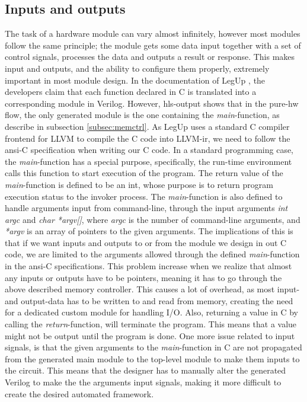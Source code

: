 \subsection{\label{subsec:inoutprobs}Inputs and outputs}
The task of a hardware module can vary almost infinitely, however most modules follow the same principle; the module gets some data input together with a set of control signals, processes the data and outputs a result or response. This makes input and outputs, and the ability to configure them properly, extremely important in most module design. In the documentation of LegUp \cite{leguparch}, the developers claim that each function declared in C is translated into a corresponding module in Verilog. However, \gls{hls}-output shows that in the pure-\gls{hw} flow, the only generated module is the one containing the \textit{main}-function, as describe in subsection \ref{subsec:memctrl}. As LegUp uses a standard C compiler frontend for LLVM to compile the C code into LLVM-\gls{ir}, we need to follow the \gls{ansi}-C specification \cite{isoc} when writing our C code. In a standard programming case, the \textit{main}-function has a special purpose, specifically, the run-time environment calls this function to start execution of the program. The return value of the \textit{main}-function is defined to be an int, whose purpose is to return program execution status to the invoker process. The \textit{main}-function is also defined to handle arguments input from command-line, through the input arguments \textit{int argc} and \textit{char *argv[]}, where \textit{argc} is the number of command-line arguments, and \textit{*argv} is an array of pointers to the given arguments. The implications of this is that if we want inputs and outputs to or from the module we design in out C code, we are limited to the arguments allowed through the defined \textit{main}-function in the \gls{ansi}-C specifications. This problem increase when we realize that almost any inputs or outputs have to be pointers, meaning it has to go through the above described memory controller. This causes a lot of overhead, as most input- and output-data has to be written to and read from memory, creating the need for a dedicated custom module for handling I/O. Also, returning a value in C by calling the \textit{return}-function, will terminate the program. This means that a value might not be output until the program is done. One more issue related to input signals, is that the given arguments to the \textit{main}-function in C are not propagated from the generated main module to the top-level module to make them inputs to the circuit. This means that the designer has to manually alter the generated Verilog to make the the arguments input signals, making it more difficult to create the desired automated framework.

